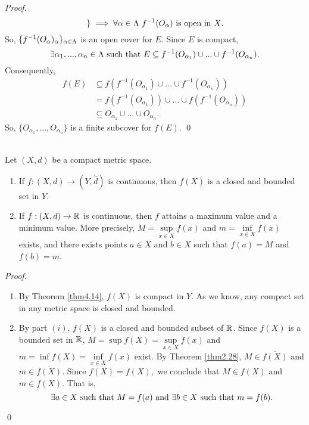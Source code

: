 \begin{proof}
$$\begin{rcases*}
    \end{rcases*} \implies \forall \alpha \in \Lambda ~f^{-1}(O_{\alpha}) \text{ is open in $X$}.$$
    So, $\{f^{-1}(O_{\alpha})_\alpha \}_{\alpha \in \Lambda}$ is an open cover for $E$. Since $E$ is compact,
    $$\exists \alpha_1, ..., \alpha_n \in \Lambda \text{ such that } E \subseteq f^{-1}(O_{\alpha_1}) \cup ... \cup f^{-1}(O_{\alpha_n}).$$
    Consequently,
    \begin{align*}
        f(E) &\subseteq f\left(f^{-1}(O_{\alpha_1})\cup ... \cup f^{-1}(O_{\alpha_n})\right) \\
        &= f(f^{-1}(O_{\alpha_1}))\cup ... \cup f(f^{-1}(O_{\alpha_n})) \\
        &\subseteq O_{\alpha_1} \cup ... \cup O_{\alpha_n}.
    \end{align*}
    So, $\{O_{\alpha_1},...,O_{\alpha_n}\}$ is a finite subcover for $f(E)$. \qed
\end{proof}

\begin{theorem}  \leavevmode \\
    \label{thm4.15}
    Let $(X,d)$ be a compact metric space.
    \begin{enumerate} [$(i)$]
        \item If $f:(X,d) \to (Y, \overset{\sim}{d})$ is continuous, then $f(X)$ is a closed and bounded set in $Y$.
        \item If $f:(X,d) \to \mathbb{R}$ is continuous, then $f$ attains a maximum value and a minimum value. More precisely, $M=\sup \limits_{x \in X}f(x)$ and $m=\inf \limits_{x \in X}f(x)$ exists, and there exists points $a\in X$ and $b \in X$ such that $f(a) = M$ and $f(b) = m$.
    \end{enumerate}
\end{theorem}

\begin{proof}
    \begin{enumerate}[$(i)$]
        \item By Theorem \ref{thm4.14}, $f(X)$ is compact in $Y$. As we know, any compact set in any metric space is closed and bounded.
        \item By part $(i)$, $f(X)$ is a closed and bounded subset of $\mathbb{R}$. Since $f(X)$ is a bounded set in $\mathbb{R}$, $M = \sup f(X) = \sup \limits_{x\in X} f(x)$ and $m = \inf f(X) = \inf \limits_{x \in X}f(x)$ exist. By Theorem \ref{thm2.28}, $M\in \overline{f(X)}$ and $m \in \overline{f(X)}$. Since $\overline{f(X)} = f(X),$ we conclude that $M\in f(X)$ and $m\in f(X)$. That is,
        $$\exists a \in X \text{ such that } M = f(a) \text{ and } \exists b \in X \text{ such that } m = f(b).$$
    \end{enumerate}
    \qed
\end{proof}

